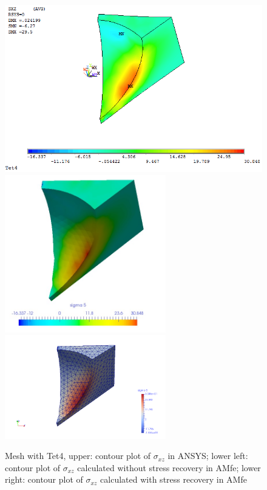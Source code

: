 \begin{figure}[htbp]
	\begin{center}
		\includegraphics[width=13cm,clip]{Tet4Sxz.png} 
		\includegraphics[width=7cm,clip]{Tet4SxzPD.png} 		
		\includegraphics[width=7cm,clip]{Tet4SxzP.png} 		
		\caption{Mesh with Tet4, upper: contour plot of $\sigma_{xz}$ in ANSYS; lower left: contour plot of $\sigma_{xz}$ calculated without stress recovery in AMfe; lower right: contour plot of $\sigma_{xz}$ calculated with stress recovery in AMfe} \label{fig: Tet4_Sxz}
	\end{center}
\end{figure}
\clearpage 


